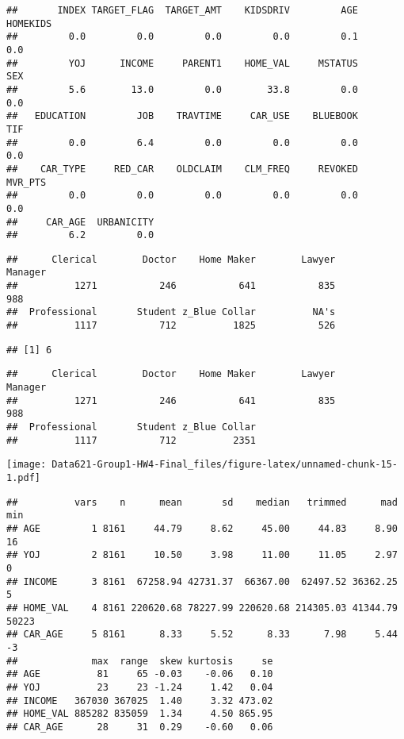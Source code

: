 \documentclass[]{article}
\begin{document}
\begin{verbatim}
##       INDEX TARGET_FLAG  TARGET_AMT    KIDSDRIV         AGE    HOMEKIDS 
##         0.0         0.0         0.0         0.0         0.1         0.0 
##         YOJ      INCOME     PARENT1    HOME_VAL     MSTATUS         SEX 
##         5.6        13.0         0.0        33.8         0.0         0.0 
##   EDUCATION         JOB    TRAVTIME     CAR_USE    BLUEBOOK         TIF 
##         0.0         6.4         0.0         0.0         0.0         0.0 
##    CAR_TYPE     RED_CAR    OLDCLAIM    CLM_FREQ     REVOKED     MVR_PTS 
##         0.0         0.0         0.0         0.0         0.0         0.0 
##     CAR_AGE  URBANICITY 
##         6.2         0.0
\end{verbatim}

\begin{verbatim}
##      Clerical        Doctor    Home Maker        Lawyer       Manager 
##          1271           246           641           835           988 
##  Professional       Student z_Blue Collar          NA's 
##          1117           712          1825           526
\end{verbatim}

\begin{verbatim}
## [1] 6
\end{verbatim}

\begin{verbatim}
##      Clerical        Doctor    Home Maker        Lawyer       Manager 
##          1271           246           641           835           988 
##  Professional       Student z_Blue Collar 
##          1117           712          2351
\end{verbatim}

\texttt{[image: Data621-Group1-HW4-Final\_files/figure-latex/unnamed-chunk-15-1.pdf]}

\begin{verbatim}
##          vars    n      mean       sd    median   trimmed      mad   min
## AGE         1 8161     44.79     8.62     45.00     44.83     8.90    16
## YOJ         2 8161     10.50     3.98     11.00     11.05     2.97     0
## INCOME      3 8161  67258.94 42731.37  66367.00  62497.52 36362.25     5
## HOME_VAL    4 8161 220620.68 78227.99 220620.68 214305.03 41344.79 50223
## CAR_AGE     5 8161      8.33     5.52      8.33      7.98     5.44    -3
##             max  range  skew kurtosis     se
## AGE          81     65 -0.03    -0.06   0.10
## YOJ          23     23 -1.24     1.42   0.04
## INCOME   367030 367025  1.40     3.32 473.02
## HOME_VAL 885282 835059  1.34     4.50 865.95
## CAR_AGE      28     31  0.29    -0.60   0.06
\end{verbatim}
\end{document}
